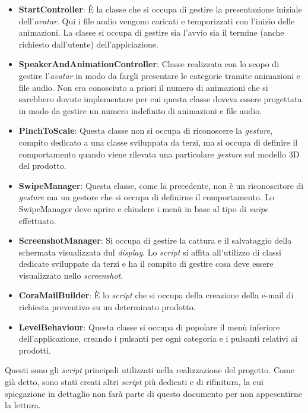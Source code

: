 \begin{itemize}
	\item \textbf{StartController}: \`E la classe che si occupa di gestire la presentazione iniziale dell'\textit{avatar\gloss}. Qui i file audio vengono caricati e temporizzati con l'inizio delle animazioni. La classe si occupa di gestire sia l'avvio sia il termine (anche richiesto dall'utente) dell'applciazione.
	
	\item \textbf{SpeakerAndAnimationController}: Classe realizzata con lo scopo di gestire l'\textit{avatar\gloss} in modo da fargli presentare le categorie tramite animazioni e file audio. Non era conosciuto a priori il numero di animazioni che si sarebbero dovute implementare per cui questa classe doveva essere progettata in modo da gestire un numero indefinito di animazioni e file audio.
	
	\item \textbf{PinchToScale}: Questa classe non si occupa di riconoscere la \textit{gesture}, compito dedicato a una classe sviluppata da terzi, ma si occupa di definire il comportamento quando viene rilevata una particolare \textit{gesture} sul modello 3D del prodotto.
	
	\item \textbf{SwipeManager}: Questa classe, come la precedente, non \`e un riconoscitore di \textit{gesture} ma un gestore che si occupa di definirne il comportamento. Lo SwipeManager deve aprire e chiudere i men\`u in base al tipo di \textit{swipe} effettuato.
	
	\item \textbf{ScreenshotManager}: Si occupa di gestire la cattura e il salvataggio della schermata visualizzata dul \textit{display}. Lo \textit{script} si affita all'utilizzo di classi dedicate sviluppate da terzi e ha il compito di gestire cosa deve essere visualizzato nello \textit{screenshot}.
	
	\item \textbf{CoraMailBuilder}: \`E lo \textit{script} che si occupa della creazione della e-mail di richiesta preventivo su un determinato prodotto.
	
	\item \textbf{LevelBehaviour}: Questa classe si occupa di popolare il men\`u inferiore dell'applicazione, creando i pulsanti per ogni categoria e i pulsanti relativi ai prodotti.
\end{itemize}
\noindent
Questi sono gli \textit{script} principali utilizzati nella realizzazione del progetto. Come gi\`a detto, sono stati creati altri \textit{script} pi\`u dedicati e di rifinitura, la cui spiegazione in dettaglio non far\`a parte di questo documento per non appesentirne la lettura.\\\\

